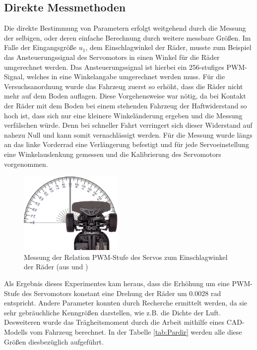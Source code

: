 \subsection{Direkte Messmethoden}
Die direkte Bestimmung von Parametern erfolgt weitgehend durch die Messung der selbigen, oder deren einfache Berechnung durch weitere messbare Größen. Im Falle der Eingangsgröße $u_{1}$, dem Einschlagwinkel der Räder, musste zum Beispiel das Ansteuerungssignal des Servomotors in einen Winkel für die Räder umgerechnet werden. Das Ansteuerungssignal ist hierbei ein 256-stufiges PWM-Signal, welches in eine Winkelangabe umgerechnet werden muss. Für die Versuchsanordnung wurde das Fahrzeug zuerst so erhöht, dass die Räder nicht mehr auf dem Boden auflagen. Diese Vorgehensweise war nötig, da bei Kontakt der Räder mit dem Boden bei einem stehenden Fahrzeug der Haftwiderstand so hoch ist, dass sich nur eine kleinere Winkeländerung ergeben und die Messung verfälschen würde. Denn bei schneller Fahrt verringert sich dieser Widerstand auf nahezu Null und kann somit vernachlässigt werden. Für die Messung wurde längs an das linke Vorderrad eine Verlängerung befestigt und für jede Servoeinstellung eine Winkelauslenkung gemessen und die Kalibrierung des Servomotors vorgenommen. 
\begin{figure}[H]
	\centering
	\includegraphics[width=5cm]{Bilder/u1Messung.png}
	\caption[Messung der Relation PWM-Stufe Servo zu Einschlagwinkel Räder]
		{Messung der Relation PWM-Stufe des Servos zum Einschlagwinkel der Räder (aus \cite{TT01} und \cite{Wim})}
	\label{pict:u1Mess}
\end{figure}
Als Ergebnis dieses Experimentes kam heraus, dass die Erhöhung um eine PWM-Stufe des Servomotors konstant eine Drehung der Räder um 0.0028 rad entspricht. Andere Parameter konnten durch Recherche ermittelt werden, da sie sehr gebräuchliche Kenngrößen darstellen, wie z.B. die Dichte der Luft. Desweiteren wurde das Trägheitsmoment durch die Arbeit \cite{TimMar} mithilfe eines CAD-Modells vom Fahrzeug berechnet. In der Tabelle \ref{tab:Pardir} werden alle diese Größen diesbezüglich aufgeführt.
